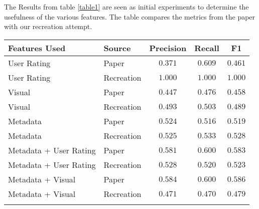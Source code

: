 The Results from table \ref{table1} are seen as initial experiments to determine the usefulness of the various features. The table compares the metrics from the paper \cite{Riegler2016} with our recreation attempt.

\begin{table*}[h]
	\begin{tabular}{|l|l|ccc|}
		\hline
		Features Used & Source & Precision & Recall & F1 \\
		\hline
		User Rating & Paper & $0.371$ & $0.609$ & $0.461$ \\
		User Rating & Recreation & $1.000$ & $1.000$ & $1.000$ \\
		\hline
		Visual & Paper & $0.447$ & $0.476$ & $0.458$ \\
		Visual & Recreation & $0.493$ & $0.503$ & $0.489$ \\
		\hline
		Metadata & Paper & $0.524$ & $0.516$ & $0.519$ \\
		Metadata & Recreation & $0.525$ & $0.533$ & $0.528$ \\
		\hline
		Metadata + User Rating & Paper & $0.581$ & $0.600$ & $0.583$ \\
		Metadata + User Rating & Recreation & $0.528$ & $0.520$ & $0.523$ \\
		\hline
		Metadata + Visual & Paper & $0.584$ & $0.600$ & $0.586$ \\
		Metadata + Visual & Recreation & $0.471$ & $0.470$ & $0.479$ \\
		\hline
		\multicolumn{5}{c}{ } \\
	\end{tabular}
	\caption{Comparison of Table 1 in the reference paper and our recreation attempt using Weka}
	\label{table1}
\end{table*}